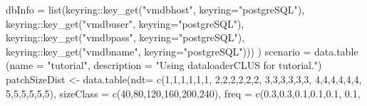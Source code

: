\documentclass[
]{article}
\newenvironment{Shaded}{\begin{snugshade}}{\end{snugshade}}
\newcommand{\AttributeTok}[1]{\textcolor[rgb]{0.77,0.63,0.00}{#1}}
\newcommand{\DecValTok}[1]{\textcolor[rgb]{0.00,0.00,0.81}{#1}}
\newcommand{\FloatTok}[1]{\textcolor[rgb]{0.00,0.00,0.81}{#1}}
\newcommand{\FunctionTok}[1]{\textcolor[rgb]{0.00,0.00,0.00}{#1}}
\newcommand{\NormalTok}[1]{#1}
\newcommand{\OtherTok}[1]{\textcolor[rgb]{0.56,0.35,0.01}{#1}}
\newcommand{\SpecialCharTok}[1]{\textcolor[rgb]{0.00,0.00,0.00}{#1}}
\newcommand{\StringTok}[1]{\textcolor[rgb]{0.31,0.60,0.02}{#1}}
\begin{document}
\begin{Shaded}
\begin{Highlighting}[]
                      \AttributeTok{dbInfo  =} \FunctionTok{list}\NormalTok{(keyring}\SpecialCharTok{::}\FunctionTok{key\_get}\NormalTok{(}\StringTok{"vmdbhost"}\NormalTok{, }\AttributeTok{keyring=}\StringTok{"postgreSQL"}\NormalTok{), }
\NormalTok{                                     keyring}\SpecialCharTok{::}\FunctionTok{key\_get}\NormalTok{(}\StringTok{"vmdbuser"}\NormalTok{, }\AttributeTok{keyring=}\StringTok{"postgreSQL"}\NormalTok{), }
\NormalTok{                                     keyring}\SpecialCharTok{::}\FunctionTok{key\_get}\NormalTok{(}\StringTok{"vmdbpass"}\NormalTok{, }\AttributeTok{keyring=}\StringTok{"postgreSQL"}\NormalTok{),  }
\NormalTok{                                     keyring}\SpecialCharTok{::}\FunctionTok{key\_get}\NormalTok{(}\StringTok{"vmdbname"}\NormalTok{, }\AttributeTok{keyring=}\StringTok{"postgreSQL"}\NormalTok{)))}
\NormalTok{  )}
\NormalTok{scenario }\OtherTok{=} \FunctionTok{data.table}\NormalTok{ (}\AttributeTok{name =} \StringTok{"tutorial"}\NormalTok{, }
                       \AttributeTok{description =} \StringTok{"Using dataloaderCLUS for tutorial."}\NormalTok{)}
\NormalTok{patchSizeDist }\OtherTok{\textless{}{-}} \FunctionTok{data.table}\NormalTok{(}\AttributeTok{ndt=} \FunctionTok{c}\NormalTok{(}\DecValTok{1}\NormalTok{,}\DecValTok{1}\NormalTok{,}\DecValTok{1}\NormalTok{,}\DecValTok{1}\NormalTok{,}\DecValTok{1}\NormalTok{,}\DecValTok{1}\NormalTok{,}
                                  \DecValTok{2}\NormalTok{,}\DecValTok{2}\NormalTok{,}\DecValTok{2}\NormalTok{,}\DecValTok{2}\NormalTok{,}\DecValTok{2}\NormalTok{,}\DecValTok{2}\NormalTok{,}
                                  \DecValTok{3}\NormalTok{,}\DecValTok{3}\NormalTok{,}\DecValTok{3}\NormalTok{,}\DecValTok{3}\NormalTok{,}\DecValTok{3}\NormalTok{,}\DecValTok{3}\NormalTok{,}
                                  \DecValTok{4}\NormalTok{,}\DecValTok{4}\NormalTok{,}\DecValTok{4}\NormalTok{,}\DecValTok{4}\NormalTok{,}\DecValTok{4}\NormalTok{,}\DecValTok{4}\NormalTok{,}
                                  \DecValTok{5}\NormalTok{,}\DecValTok{5}\NormalTok{,}\DecValTok{5}\NormalTok{,}\DecValTok{5}\NormalTok{,}\DecValTok{5}\NormalTok{,}\DecValTok{5}\NormalTok{), }
                           \AttributeTok{sizeClass =} \FunctionTok{c}\NormalTok{(}\DecValTok{40}\NormalTok{,}\DecValTok{80}\NormalTok{,}\DecValTok{120}\NormalTok{,}\DecValTok{160}\NormalTok{,}\DecValTok{200}\NormalTok{,}\DecValTok{240}\NormalTok{), }
                           \AttributeTok{freq =} \FunctionTok{c}\NormalTok{(}\FloatTok{0.3}\NormalTok{,}\FloatTok{0.3}\NormalTok{,}\FloatTok{0.1}\NormalTok{,}\FloatTok{0.1}\NormalTok{,}\FloatTok{0.1}\NormalTok{, }\FloatTok{0.1}\NormalTok{,}

\end{Highlighting}
\end{Shaded}
\end{document}
